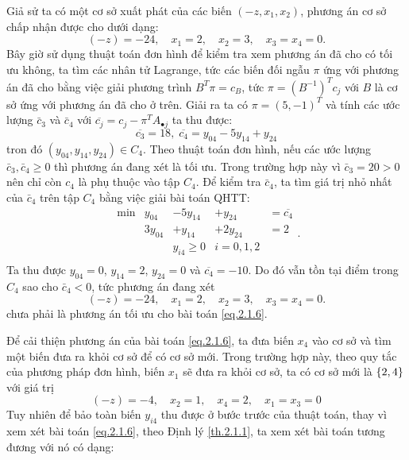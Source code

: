 Giả sử ta có một cơ sở xuất phát của các biến $(-z, x_1, x_2)$, phương án cơ sở chấp nhận được cho dưới dạng:
\begin{displaymath}
(-z)=-24,\quad x_1=2,\quad x_2=3,\quad x_3=x_4 = 0.
\end{displaymath}
Bây giờ sử dụng thuật toán đơn hình để kiểm tra xem phương án đã cho có tối ưu không, ta tìm các nhân tử Lagrange, tức các biến đối ngẫu $\pi$ ứng với phương án đã cho bằng việc giải phương trình $B^T\pi = c_B$, tức $\pi = (B^{-1})^Tc_j$ với $B$ là cơ sở ứng với phương án đã cho ở trên. Giải ra ta có $\pi=(5,-1)^T$ và tính các ước lượng $\bar c_3$ và $\bar c_4$ với $\overline{c_j}=c_j-\pi^TA_{\bullet j}$ ta thu được:
$$
\overline{c_3}=18, \;\overline{c_4}=y_{04}-5y_{14}+y_{24}
$$
tron đó $(y_{04},y_{14},y_{24})\in C_4$. 
Theo thuật toán đơn hình, nếu các ước lượng $\bar c_3, \bar c_4 \geq 0$ thì phương án đang xét là tối ưu. Trong trường hợp này vì $\bar c_3=20>0$ nên chỉ còn $c_4$ là phụ thuộc vào tập $C_4$. Để kiểm tra $\bar c_4$, ta tìm giá trị nhỏ nhất của $\bar c_4$ trên tập $C_4$ bằng việc giải bài toán QHTT:
\begin{equation}\label{eq.2.1.8}
\begin{array}{llllll}
\min &y_{04}&-5y_{14}&+y_{24}&=\overline{c_4}\\
&3y_{04}&+y_{14}&+2y_{24}&=2\\
&&y_{i4}\geq0 & i=0,1,2\\
\end{array}.
\end{equation}
Ta thu được $y_{04}=0$, $y_{14}=2$, $y_{24}=0$ và $\overline{c_4}=-10$. Do đó vẫn tồn tại điểm trong $C_4$ sao cho $\bar c_4 < 0$, tức phương án đang xét  
\begin{displaymath}
(-z)=-24,\quad x_1=2,\quad x_2=3,\quad x_3=x_4 = 0.
\end{displaymath}
chưa phải là phương án tối ưu cho bài toán \eqref{eq.2.1.6}.

Để cải thiện phương án của bài toán \eqref{eq.2.1.6}, ta đưa biến $x_4$ vào cơ sở và tìm một biến đưa ra khỏi cơ sở để có cơ sở mới. Trong trường hợp này, theo quy tắc của phương pháp đơn hình, biến $x_1$ sẽ đưa ra khỏi cơ sở, ta có cơ sở mới là $\{2, 4\}$ với giá trị
$$
(-z)=-4,\quad x_2=1,\quad x_4=2,\quad x_1=x_3=0
$$
Tuy nhiên để bảo toàn biến $y_{i4}$ thu được ở bước trước của thuật toán, thay vì xem xét bài toán \eqref{eq.2.1.6}, theo Định lý \ref{th.2.1.1}, ta xem xét bài toán tương đương với nó có dạng:

